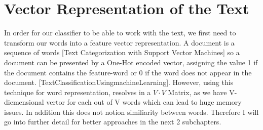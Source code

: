 \documentclass[a4paper, 11pt,titlepage,oneside,openany]{book}
\begin{document}
\section{Vector Representation of the Text}
In order for our classifier to be able to work with the text, we first need to transform our words into a feature vector representation. A document is a sequence of words [Text Categorization with Support Vector Machines] so a document can be presented by a One-Hot encoded vector, assigning the value 1 if the document contains the feature-word or 0 if the word does not appear in the document. [TextClassificationUsingmachineLearning]. However, using this technique for word representation, resolves in a $V \cdot V$ Matrix, as we have V-diemensional vertor for each out of V words which can lead to huge memory issues. In addition this does not notion similiarity between words. Therefore I will go into further detail for better approaches in the next 2 subchapters.
\end{document}
